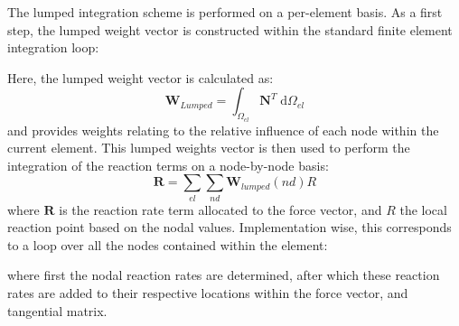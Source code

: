 \documentclass[3p]{elsarticle} %
\begin{document}
The lumped integration scheme is performed on a per-element basis. As a first step, the lumped weight vector is constructed within the standard finite element integration loop:



Here, the lumped weight vector is calculated as:
\begin{equation}
	\mathbf{W}_{Lumped} = \int_{\Omega_{el}}\mathbf{N}^T\;\mathrm{d}\Omega_{el}
\end{equation}
and provides weights relating to the relative influence of each node within the current element. This lumped weights vector is then used to perform the integration of the reaction terms on a node-by-node basis:
\begin{equation}
	\mathbf{R} = \sum_{el} \sum_{nd} \mathbf{W}_{lumped}(nd) R
\end{equation}
where $\mathbf{R}$ is the reaction rate term allocated to the force vector, and $R$ the local reaction point based on the nodal values. Implementation wise, this corresponds to a loop over all the nodes contained within the element:

where first the nodal reaction rates are determined, after which these reaction rates are added to their respective locations within the force vector, and tangential matrix. 
\end{document}

